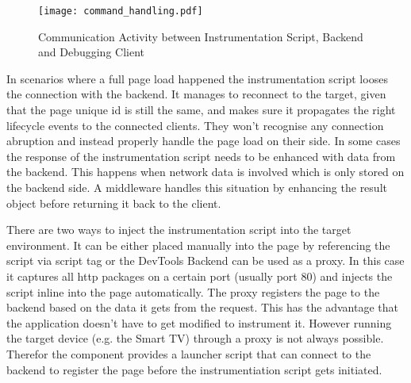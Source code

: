 \begin{figure}[htb]
  \centering
  \texttt{[image: command\_handling.pdf]}\\
  \caption{Communication Activity between Instrumentation Script, Backend and Debugging Client}\label{fig:command_handling}
\end{figure}

In scenarios where a full page load happened the instrumentation script looses the connection with
the backend. It manages to reconnect to the target, given that the page unique id is still the same,
and makes sure it propagates the right lifecycle events to the connected clients. They won't recognise
any connection abruption and instead properly handle the page load on their side. In some cases the
response of the instrumentation script needs to be enhanced with data from the backend. This happens
when network data is involved which is only stored on the backend side. A middleware handles this
situation by enhancing the result object before returning it back to the client.

There are two ways to inject the instrumentation script into the target environment. It can be either
placed manually into the page by referencing the script via script tag or the DevTools Backend can be
used as a proxy. In this case it captures all http packages on a certain port (usually port 80) and
injects the script inline into the page automatically. The proxy registers the page to the backend
based on the data it gets from the request. This has the advantage that the application doesn't have
to get modified to instrument it. However running the target device (e.g. the Smart TV) through a
proxy is not always possible. Therefor the component provides a launcher script that can connect to
the backend to register the page before the instrumentiation script gets initiated.

